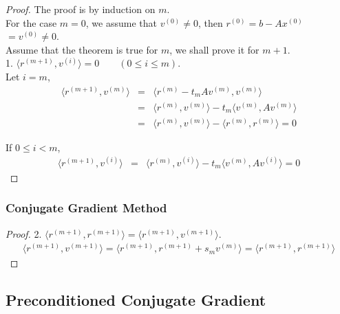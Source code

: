 \documentclass[notheorems,mathserif,table,compress]{beamer}  %
\begin{document}
%
\begin{frame}
\begin{proof}
The proof is by induction on $m$.\\
For the case $m=0$, we assume that $v^{(0)}\neq 0$, then $r^{(0)}=b-Ax^{(0)}$\\$=v^{(0)}\neq 0$.\\
Assume that the theorem is true for $m$, we shall prove it for $m+1$.\\
1. $\langle r^{(m+1)},v^{(i)}\rangle=0 \qquad (0\leq i\leq m)$.\\
Let $i=m$,
\begin{eqnarray*}
\langle r^{(m+1)},v^{(m)}\rangle&=&\langle r^{(m)}-t_mAv^{(m)},v^{(m)}\rangle\\
                                &=&\langle r^{(m)},v^{(m)}\rangle-t_m\langle v^{(m)},Av^{(m)}\rangle\\
                                &=&\langle r^{(m)},v^{(m)}\rangle-\langle r^{(m)},r^{(m)}\rangle=0
\end{eqnarray*}

If $0\leq i<m$,
\begin{eqnarray*}
\langle r^{(m+1)},v^{(i)}\rangle&=&\langle r^{(m)},v^{(i)}\rangle-t_m\langle v^{(m)},Av^{(i)}\rangle=0                              
\end{eqnarray*}
\end{proof}

\end{frame}

%
\begin{frame}
\frametitle{Conjugate Gradient Method}
\begin{proof}
2. $\langle r^{(m+1)},r^{(m+1)}\rangle=\langle r^{(m+1)},v^{(m+1)}\rangle$.
\begin{eqnarray*}
\langle r^{(m+1)},v^{(m+1)}\rangle=\langle r^{(m+1)},r^{(m+1)}+s_mv^{(m)}\rangle=\langle r^{(m+1)},r^{(m+1)}\rangle                             
\end{eqnarray*}

\end{proof}
\end{frame}

\subsection{Preconditioned Conjugate Gradient}
\end{document}
